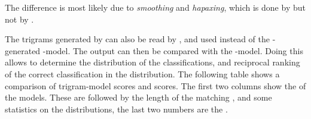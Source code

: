 \documentclass[a4paper,10pt,twoside]{report}
\begin{document}
The difference is most likely due to \emph{smoothing} and
\emph{hapaxing}, which is done by \srilm{} but not by \wopr{}.

The trigrams generated by \srilm{} can also be read by \wopr{}, and
used instead of the \wopr{}-generated \ngram{}-model. The output can
then be compared with the \wopr{} \ngram{}-model. Doing this allows
\wopr{} to determine the distribution of the classifications, and
reciprocal ranking of the correct classification in the
distribution. The following table shows a comparison of \wopr{}
trigram-model scores and \srilm{} scores. The first two columns show
the \ltenp{} of the models. These are followed by the length of the
matching \ngram{}, and some statistics on the distributions, the last
two numbers are the \rr{}.
\end{document}
